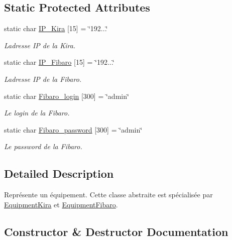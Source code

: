 \subsection*{Static Protected Attributes}
\begin{DoxyCompactItemize}
\item 
static char \hyperlink{class_e_p_1_1_equipment_a05245b7dd3a4b4e3fb7ab258e6bbe6a2}{I\+P\+\_\+\+Kira} \mbox{[}15\mbox{]} = \char`\"{}192...\char`\"{}
\begin{DoxyCompactList}\small\item\em L\textquotesingle{}adresse IP de la Kira. \end{DoxyCompactList}\item 
static char \hyperlink{class_e_p_1_1_equipment_a76405ab4adccec1b32a1c874171749e6}{I\+P\+\_\+\+Fibaro} \mbox{[}15\mbox{]} = \char`\"{}192...\char`\"{}
\begin{DoxyCompactList}\small\item\em L\textquotesingle{}adresse IP de la Fibaro. \end{DoxyCompactList}\item 
static char \hyperlink{class_e_p_1_1_equipment_a91662c50e9eac8a97c2eb5fcc0f1876c}{Fibaro\+\_\+login} \mbox{[}300\mbox{]} = \char`\"{}admin\char`\"{}
\begin{DoxyCompactList}\small\item\em Le login de la Fibaro. \end{DoxyCompactList}\item 
static char \hyperlink{class_e_p_1_1_equipment_ad59ffc7e13909e5586601a1e9ce4f9ee}{Fibaro\+\_\+password} \mbox{[}300\mbox{]} = \char`\"{}admin\char`\"{}
\begin{DoxyCompactList}\small\item\em Le password de la Fibaro. \end{DoxyCompactList}\end{DoxyCompactItemize}


\subsection{Detailed Description}
Représente un équipement. Cette classe abstraite est spécialisée par \hyperlink{class_e_p_1_1_equipment_kira}{Equipment\+Kira} et \hyperlink{class_e_p_1_1_equipment_fibaro}{Equipment\+Fibaro}. 

\subsection{Constructor \& Destructor Documentation}
